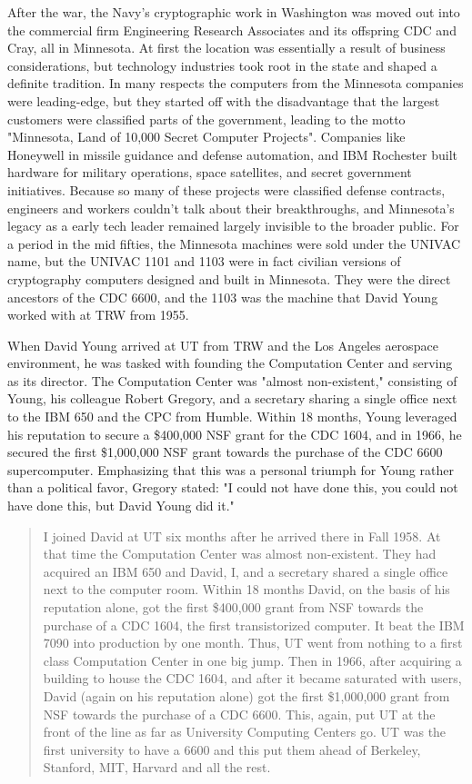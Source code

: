 After the war, the Navy's cryptographic work in Washington was moved out into the commercial firm Engineering Research Associates and its offspring CDC and Cray, all in Minnesota. At first the location was essentially a result of business considerations, but technology industries took root in the state and shaped a definite tradition. In many respects the computers from the Minnesota companies were leading-edge, but they started off with the disadvantage that the largest customers were classified parts of the government, leading to the motto "Minnesota, Land of 10,000 Secret Computer Projects". Companies like Honeywell in missile guidance and defense automation, and IBM Rochester built hardware for military operations, space satellites, and secret government initiatives. Because so many of these projects were classified defense contracts, engineers and workers couldn't talk about their breakthroughs, and Minnesota's legacy as a early tech leader remained largely invisible to the broader public. For a period in the mid fifties, the Minnesota machines were sold under the UNIVAC name, but the UNIVAC 1101 and 1103 were in fact civilian versions of cryptography computers designed and built in Minnesota. They were the direct ancestors of the CDC 6600, and the 1103 was the machine that David Young worked with at TRW from 1955. \cite{blankSecretHistoryMinnesota2023}

When David Young arrived at UT from TRW and the Los Angeles aerospace environment, he was tasked with founding the Computation Center and serving as its director. The Computation Center was "almost non-existent," consisting of Young, his colleague Robert Gregory, and a secretary sharing a single office next to the IBM 650 and the CPC from Humble. Within 18 months, Young leveraged his reputation to secure a \$400,000 NSF grant for the CDC 1604, and in 1966, he secured the first \$1,000,000 NSF grant towards the purchase of the CDC 6600 supercomputer. Emphasizing that this was a personal triumph for Young rather than a political favor, Gregory stated: "I could not have done this, you could not have done this, but David Young did it."

\begin{quotation}
I joined David at UT six months after he arrived there in Fall 1958. At that time the Computation Center was almost non-existent. They had acquired an IBM 650 and David, I, and a secretary shared a single office next to the computer room. Within 18 months David, on the basis of his reputation alone, got the first \$400,000 grant from NSF towards the purchase of a CDC 1604, the first transistorized computer. It beat the IBM 7090 into production by one month. Thus, UT went from nothing to a first class Computation Center in one big jump. Then in 1966, after acquiring a building to house the CDC 1604, and after it became saturated with users, David (again on his reputation alone) got the first \$1,000,000 grant from NSF towards the purchase of a CDC 6600. This, again, put UT at the front of the line as far as University Computing Centers go. UT was the first university to have a 6600 and this put them ahead of Berkeley, Stanford, MIT, Harvard and all the rest.
\end{quotation}

